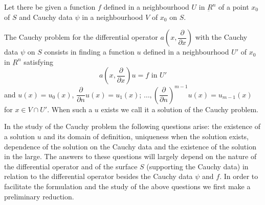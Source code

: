 Let there be given a function $f$ defined in a neighbourhood $U$ in 
$\underbar{R}^n$ of a point $x_0$ of $S$ and Cauchy data $\psi$ in a
neighbourhood $V$ of $x_0$ on $S$.\pageoriginale 

The Cauchy problem for the differential operator  $a \left(x, \dfrac
{\partial}{\partial x}\right)$ with the Cauchy data $\psi$ on $S$ consists
in finding a function $u$ defined in a neighbourhood $U'$ of $x_0$ in
$\underbar{R}^n$ satisfying 
\begin{equation}
a \left(x, \frac{\partial}{\partial x}\right) u =f \text{ in }
U'\tag{2.1}\label{chap1-eq2.1}  
\end{equation}
and $u(x) =u_0 (x)$, $\dfrac{\partial}{\partial n} u(x) = u_1(x)$;
$\ldots,  \left(\dfrac{\partial}{\partial n}\right)^{m-1} u(x) =u_{m-1} (x)$ for
$x \in V \cap U'$. When such a $u$ exists we call it a
solution of the Cauchy problem. 

In the study of the Cauchy problem the following questions arise: the
existence of a solution $u$ and its domain of definition,  uniqueness
when the solution exists,  dependence of the solution on the Cauchy
data and the existence of the solution in the large. The answers to
these questions will largely depend on the nature of the differential
operator and of the surface $S$  (supporting the Cauchy data) in
relation to the differential operator besides the Cauchy data $\psi$
and $f$. In order to facilitate the formulation and the study of the
above questions we first make a preliminary reduction. 

